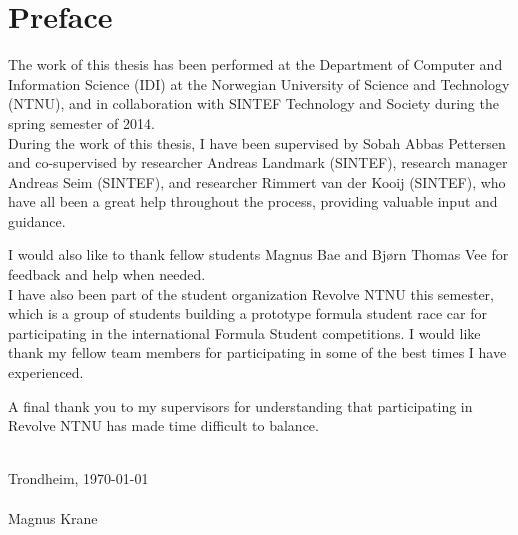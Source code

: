 \section*{Preface}

The work of this thesis has been performed at the Department of Computer and
Information Science (IDI) at the Norwegian University of Science and Technology
(NTNU), and in collaboration with SINTEF Technology and Society during the
spring semester of 2014. \\

During the work of this thesis, I have been supervised by Sobah Abbas Pettersen
and co-supervised by researcher Andreas Landmark (SINTEF), research manager
Andreas Seim (SINTEF), and researcher Rimmert van der Kooij (SINTEF), who have
all been a great help throughout the process, providing valuable input and
guidance.

I would also like to thank fellow students Magnus Bae and Bjørn Thomas Vee for
feedback and help when needed.\\

I have also been part of the student organization Revolve NTNU this semester,
which is a group of students building a prototype formula student race car for
participating in the international Formula Student competitions. I would like
thank my fellow team members for participating in some of the best times I have
experienced.

A final thank you to my supervisors for understanding that participating in
Revolve NTNU has made time difficult to balance.

\mbox{}\\[1pc]
Trondheim, \today\\
\mbox{}\\[1pc]
Magnus Krane

\clearpage
